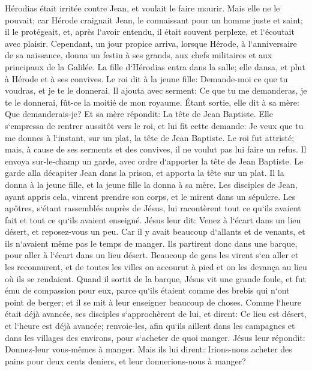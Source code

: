 \verse Hérodias était irritée contre Jean, et voulait le faire mourir. 
\verse Mais elle ne le pouvait; car Hérode craignait Jean, le connaissant pour un homme juste et saint; il le protégeait, et, après l`avoir entendu, il était souvent perplexe, et l`écoutait avec plaisir. 
\verse Cependant, un jour propice arriva, lorsque Hérode, à l`anniversaire de sa naissance, donna un festin à ses grands, aux chefs militaires et aux principaux de la Galilée. 
\verse La fille d`Hérodias entra dans la salle; elle dansa, et plut à Hérode et à ses convives. Le roi dit à la jeune fille: Demande-moi ce que tu voudras, et je te le donnerai. 
\verse Il ajouta avec serment: Ce que tu me demanderas, je te le donnerai, fût-ce la moitié de mon royaume. 
\verse Étant sortie, elle dit à sa mère: Que demanderais-je? Et sa mère répondit: La tête de Jean Baptiste. 
\verse Elle s`empressa de rentrer aussitôt vers le roi, et lui fit cette demande: Je veux que tu me donnes à l`instant, sur un plat, la tête de Jean Baptiste. 
\verse Le roi fut attristé; mais, à cause de ses serments et des convives, il ne voulut pas lui faire un refus. 
\verse Il envoya sur-le-champ un garde, avec ordre d`apporter la tête de Jean Baptiste. 
\verse Le garde alla décapiter Jean dans la prison, et apporta la tête sur un plat. Il la donna à la jeune fille, et la jeune fille la donna à sa mère. 
\verse Les disciples de Jean, ayant appris cela, vinrent prendre son corps, et le mirent dans un sépulcre. 
\verse Les apôtres, s`étant rassemblés auprès de Jésus, lui racontèrent tout ce qu`ils avaient fait et tout ce qu`ils avaient enseigné. 
\verse Jésus leur dit: Venez à l`écart dans un lieu désert, et reposez-vous un peu. Car il y avait beaucoup d`allants et de venants, et ils n`avaient même pas le temps de manger. 
\verse Ils partirent donc dans une barque, pour aller à l`écart dans un lieu désert. 
\verse Beaucoup de gens les virent s`en aller et les reconnurent, et de toutes les villes on accourut à pied et on les devança au lieu où ils se rendaient. 
\verse Quand il sortit de la barque, Jésus vit une grande foule, et fut ému de compassion pour eux, parce qu`ils étaient comme des brebis qui n`ont point de berger; et il se mit à leur enseigner beaucoup de choses. 
\verse Comme l`heure était déjà avancée, ses disciples s`approchèrent de lui, et dirent: Ce lieu est désert, et l`heure est déjà avancée; 
\verse renvoie-les, afin qu`ils aillent dans les campagnes et dans les villages des environs, pour s`acheter de quoi manger. 
\verse Jésus leur répondit: Donnez-leur vous-mêmes à manger. Mais ils lui dirent: Irions-nous acheter des pains pour deux cents deniers, et leur donnerions-nous à manger? 
